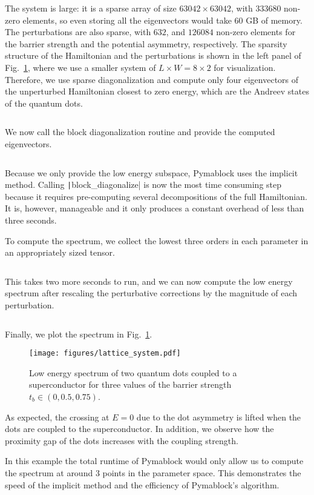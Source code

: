 The system is large: it is a sparse array of size $63042 \times 63042$, with
$333680$ non-zero elements, so even storing all the eigenvectors would take
$60$ GB of memory.
The perturbations are also sparse, with $632$, and $126084$ non-zero elements
for the barrier strength and the potential asymmetry, respectively.
The sparsity structure of the Hamiltonian and the perturbations is shown in the
left panel of Fig.~\ref{fig:QD_spectrum}, where we use a smaller system of $L
\times W = 8 \times 2$ for visualization.
Therefore, we use sparse diagonalization and compute only four eigenvectors of
the unperturbed Hamiltonian closest to zero energy, which are the Andreev
states of the quantum dots.
%
\inputminted[firstline=62, lastline=63]{python}{code_figures/lattice_system.py}
%
We now call the block diagonalization routine and provide the computed
eigenvectors.
%
\inputminted[firstline=65, lastline=65]{python}{code_figures/lattice_system.py}
%
Because we only provide the low energy subspace, Pymablock uses the implicit
method.
Calling \texttt|block_diagonalize| is now the most time consuming
step because it requires pre-computing several decompositions of the full
Hamiltonian.
It is, however, manageable and it only produces a constant overhead of less
than three seconds.

To compute the spectrum, we collect the lowest three orders in each parameter
in an appropriately sized tensor.
%
\inputminted[firstline=71, lastline=71]{python}{code_figures/lattice_system.py}
%
This takes two more seconds to run, and we can now compute the low energy
spectrum after rescaling the perturbative corrections by the magnitude of each
perturbation.
%
\inputminted[firstline=74, lastline=79]{python}{code_figures/lattice_system.py}
%
Finally, we plot the spectrum in Fig.~\ref{fig:QD_spectrum}.
%
\begin{figure}[h!]
\centering
\texttt{[image: figures/lattice\_system.pdf]}
\caption{
    Low energy spectrum of two quantum dots coupled to a superconductor for
    three values of the barrier strength $t_b \in (0, 0.5, 0.75)$.
}
\label{fig:QD_spectrum}
\end{figure}
%
As expected, the crossing at $E=0$ due to the dot asymmetry is lifted when the
dots are coupled to the superconductor.
In addition, we observe how the proximity gap of the dots increases with the
coupling strength.

In this example the total runtime of Pymablock would only allow us to compute
the spectrum at around $3$ points in the parameter space.
This demonstrates the speed of the implicit method and the efficiency of
Pymablock's algorithm.
